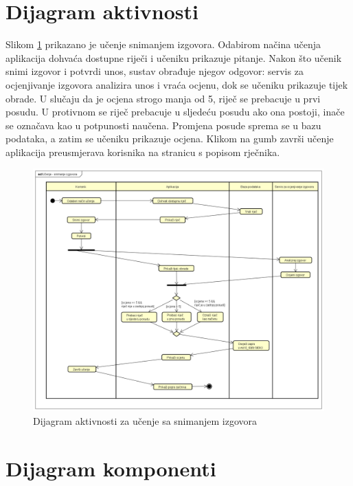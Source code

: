 \eject


\section{Dijagram aktivnosti}

Slikom \ref{fig:aktivnosti-izgovor} prikazano je učenje snimanjem izgovora. Odabirom načina učenja aplikacija dohvaća dostupne riječi i učeniku prikazuje pitanje. Nakon što učenik snimi izgovor i potvrdi unos, sustav obrađuje njegov odgovor: servis za ocjenjivanje izgovora analizira unos i vraća ocjenu, dok se učeniku prikazuje tijek obrade. U slučaju da je ocjena strogo manja od 5, riječ se prebacuje u prvi posudu. U protivnom se riječ prebacuje u sljedeću posudu ako ona postoji, inače se označava kao u potpunosti naučena. Promjena posude sprema se u bazu podataka, a zatim se učeniku prikazuje ocjena. Klikom na gumb završi učenje aplikacija preusmjerava korisnika na stranicu s popisom rječnika.
	
\begin{figure}[htp]
\includegraphics[scale=0.35]{dijagrami/aktivnosti.png}
\centering
\caption{Dijagram aktivnosti za učenje sa snimanjem izgovora}
\label{fig:aktivnosti-izgovor}
\end{figure}


	\eject
\section{Dijagram komponenti}

